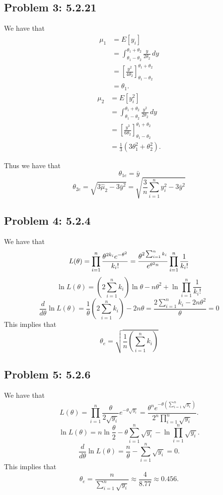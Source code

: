 \documentclass{article}
\begin{document}
\subsection*{Problem 3: 5.2.21}

We have that 
\begin{align*}
	\mu_1 &= E[y_i] \\
	&= \int_{\theta_1-\theta_2}^{\theta_1+\theta_2} \frac{y}{2\theta_2} \,dy\\
	&= \left[\frac{y^2}{4\theta_2}\right]_{\theta_1-\theta_2}^{\theta_1+\theta_2} \\
	&= \theta_1.
\end{align*}
\begin{align*}
	\mu_2 &= E[y_i^2] \\
	&= \int_{\theta_1-\theta_2}^{\theta_1+\theta_2} \frac{y^2}{2\theta_2} \,dy\\
	&= \left[\frac{y^3}{6\theta_2}\right]_{\theta_1-\theta_2}^{\theta_1+\theta_2} \\
	&= \frac{1}{3}(3\theta_1^2+\theta_2^2).
\end{align*}

Thus we have that 
\[
	\theta_{1e} = \bar{y}
\]
\[
	\theta_{2e} = \sqrt{3\hat{\mu}_2-3\bar{y}^2}
	= \sqrt{\frac{3}{n}\sum_{i=1}^n y_i^2 -3\bar{y}^2}
\]
\newpage

\subsection*{Problem 4: 5.2.4}
We have that 
\[
	L(\theta) = \prod_{i=1}^{n} \frac{\theta^{2k_i}e^{-\theta^2}}{k_i!} \\
	= \frac{\theta^{2\sum_{i=1}^nk_i}}{e^{\theta^2n}} \prod_{i=1}^{n} \frac{1}{k_i!} \\
\]
\[
	\ln L(\theta) = \left(2\sum_{i=1}^nk_i \right)\ln \theta -n\theta^2
		+ \ln \prod_{i=1}^{n} \frac{1}{k_i!} 
\]
\[
	\frac{d}{d\theta} \ln L(\theta) = 
	\frac{1}{\theta}\left(2\sum_{i=1}^nk_i \right) -2n\theta 
	= \frac{2\sum_{i=1}^nk_i -2n\theta^2}{\theta}= 0
\]
This implies that 
\[
	\theta_e = \sqrt{\frac{1}{n} \left(\sum_{i=1}^nk_i \right)}
\]
\newpage

\subsection*{Problem 5: 5.2.6}

We have that 
\[
	L(\theta) 
	= \prod_{i=1}^n \frac{\theta}{2\sqrt{y_i}}e^{-\theta\sqrt{y_i}}
	= \frac{\theta^ne^{-\theta(\sum_{i=1}^n \sqrt{y_i})}}{2^n\prod_{i=1}^{n} \sqrt{y_i}}.
\]
\[
	\ln L(\theta) 
	= n\ln\frac{\theta}{2}-\theta\sum_{i=1}^n \sqrt{y_i} - \ln \prod_{i=1}^{n} \sqrt{y_i}.
\]
\[
	\frac{d}{d\theta} \ln L(\theta) 
	= \frac{n}{\theta} - \sum_{i=1}^n \sqrt{y_i} = 0.
\]
This implies that
\[
	\theta_e 
	= \frac{n}{\sum_{i=1}^n \sqrt{y_i}}
	\approx\frac{4}{8.77}
	\approx 0.456.
\]
\newpage
\end{document}
